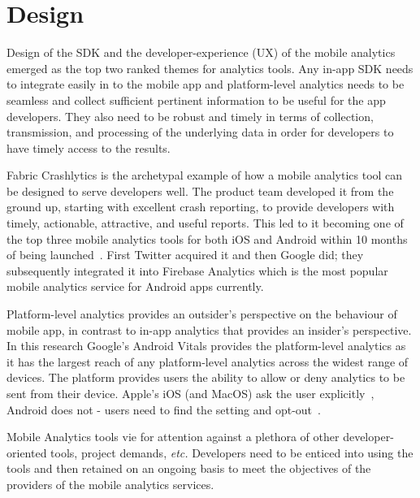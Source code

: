 \section{Design}
Design of the SDK and the developer-experience (UX) of the mobile analytics emerged as the top two ranked themes for analytics tools. Any in-app SDK needs to integrate easily in to the mobile app and platform-level analytics needs to be seamless and collect sufficient pertinent information to be useful for the app developers. They also need to be robust and timely in terms of collection, transmission, and processing of the underlying data in order for developers to have timely access to the results. 

Fabric Crashlytics is the archetypal example of how a mobile analytics tool can be designed to serve developers well. The product team developed it from the ground up, starting with excellent crash reporting, to provide developers with timely, actionable, attractive, and useful reports. This led to it becoming one of the top three mobile analytics tools for both iOS and Android within 10 months of being launched~\citep{___answersblog_2015_may_crashlytics-no1-in-performance}. %
First Twitter acquired it and then Google did; they subsequently integrated it into Firebase Analytics which is the most popular mobile analytics service for Android apps currently.

Platform-level analytics provides an outsider's perspective on the behaviour of mobile app, in contrast to in-app analytics that provides an insider's perspective. In this research Google's Android Vitals provides the platform-level analytics as it has the largest reach of any platform-level analytics across the widest range of devices. The platform provides users the ability to allow or deny analytics to be sent from their device. Apple's iOS (and MacOS) ask the user explicitly~\citep{apple_ios_share_diagnostics}, Android does not - users need to find the setting and opt-out~\citep{google_play_share_usage_and_diagnostics_info_with_google}. %

Mobile Analytics tools vie for attention against a plethora of other developer-oriented tools, project demands, \emph{etc.} Developers need to be enticed into using the tools and then retained on an ongoing basis to meet the objectives of the providers of the mobile analytics services.

